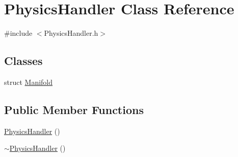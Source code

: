 \hypertarget{class_physics_handler}{}\section{Physics\+Handler Class Reference}
\label{class_physics_handler}


{\ttfamily \#include $<$Physics\+Handler.\+h$>$}

\subsection*{Classes}
\begin{DoxyCompactItemize}
\item 
struct \mbox{\hyperlink{struct_physics_handler_1_1_manifold}{Manifold}}
\end{DoxyCompactItemize}
\subsection*{Public Member Functions}
\begin{DoxyCompactItemize}
\item 
\mbox{\hyperlink{class_physics_handler_a8107082a913d552fc7e513eced1e2765}{Physics\+Handler}} ()
\item 
\mbox{\hyperlink{class_physics_handler_ac58b90a4a8c5e83624547946b5f47725}{$\sim$\+Physics\+Handler}} ()
\end{DoxyCompactItemize}

